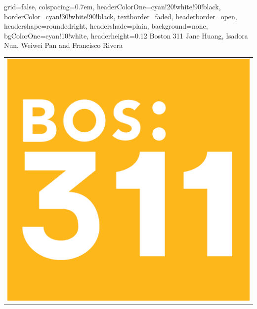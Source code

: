 \documentclass[landscape,a0paper,fontscale=0.292]{baposter}
\begin{document}
\begin{poster}{
 grid=false,
 colspacing=0.7em,
 headerColorOne=cyan!20!white!90!black,
 borderColor=cyan!30!white!90!black,
 textborder=faded,
 headerborder=open,
 headershape=roundedright,
 headershade=plain,
 background=none,
 bgColorOne=cyan!10!white,
 headerheight=0.12\textheight}
 {
 }
 {\sc\Huge Boston 311}
 {Jane Huang, Isadora Nun, Weiwei Pan and Francisco Rivera\\[1em]
}
 {
  \begin{tabular}{r}
    \includegraphics[height=0.12\textheight]{bos_logo_sm}
  \end{tabular}
 }



\end{poster}
\end{document}
